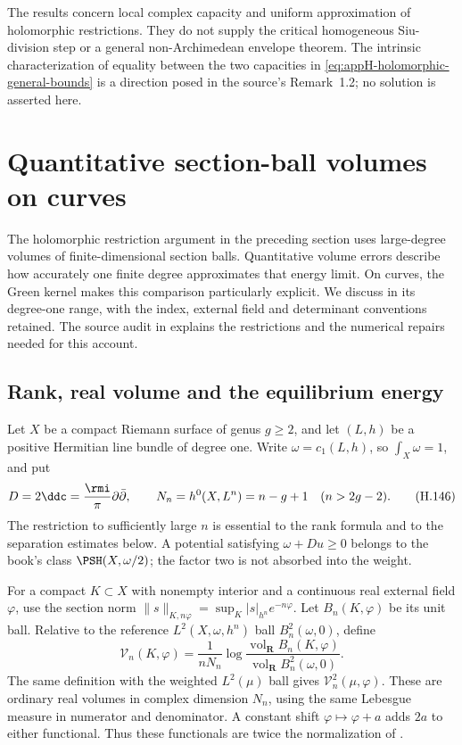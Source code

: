The results concern local complex capacity and uniform
approximation of holomorphic restrictions. They do not supply
the critical homogeneous Siu-division step or a general
non-Archimedean envelope theorem. The intrinsic characterization
of equality between the two capacities in
\eqref{eq:appH-holomorphic-general-bounds} is a direction posed
in the source's Remark~1.2; no solution is asserted here.

\section{Quantitative section-ball volumes on curves}
\label{sec:appH-section-ball-rates}

The holomorphic restriction argument in the preceding section uses
large-degree volumes of finite-dimensional section balls. Quantitative
volume errors describe how accurately one finite degree approximates
that energy limit. On curves, the Green kernel makes this comparison
particularly explicit. We discuss \cite{Wu26SectionBallRatesV1} in its
degree-one range, with the index, external field and determinant
conventions retained. The source audit in
 explains the restrictions
and the numerical repairs needed for this account.

\subsection{Rank, real volume and the equilibrium energy}

Let $X$ be a compact Riemann surface of genus $g\geq2$, and let
$(L,h)$ be a positive Hermitian line bundle of degree one. Write
$\omega=c_1(L,h)$, so $\int_X\omega=1$, and put
\[
 D=2\ddc=\frac{\rmi}{\pi}\partial\bar\partial,
 \qquad N_n=h^0(X,L^n)=n-g+1\quad(n>2g-2).
 \tag{H.146}\label{eq:appH-curve-volume-units}
\]
The restriction to sufficiently large $n$ is essential to the rank
formula and to the separation estimates below. A potential satisfying
$\omega+Du\geq0$ belongs to the book's class
$\PSH(X,\omega/2)$; the factor two is not absorbed into the weight.

For a compact $K\subset X$ with nonempty interior and a continuous
real external field $\varphi$, use the section norm
$\|s\|_{K,n\varphi}=\sup_K|s|_{h^n}e^{-n\varphi}$.
Let $B_n(K,\varphi)$ be its unit ball. Relative to the reference
$L^2(X,\omega,h^n)$ ball $B_n^2(\omega,0)$, define
\[
 \mathcal V_n(K,\varphi)
 =\frac{1}{nN_n}\log
   \frac{\operatorname{vol}_{\mathbf R}B_n(K,\varphi)}
        {\operatorname{vol}_{\mathbf R}B_n^2(\omega,0)}.
 \tag{H.147}\label{eq:appH-curve-ball-volume}
\]
The same definition with the weighted $L^2(\mu)$ ball gives
$\mathcal V_n^2(\mu,\varphi)$. These are ordinary real volumes
in complex dimension $N_n$, using the same Lebesgue measure
in numerator and denominator. A constant shift $\varphi\mapsto
\varphi+a$ adds $2a$ to either functional. Thus these functionals
are twice the normalization of \cite{BB10}.

